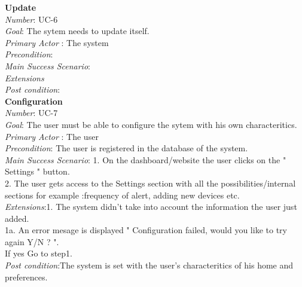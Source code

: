 \textbf{Update}\\
\textit{Number}: UC-6 \\
\textit{Goal}: The sytem needs to update itself. \\
\textit{Primary Actor} : The system \\
\textit{Precondition}: \\
\textit{Main Success Scenario}: \\
\textit{Extensions} \\
\textit{Post condition}: \\

\textbf{Configuration} \\
\textit{Number}: UC-7\\
\textit{Goal}: The user must be able to configure the sytem with his own characteritics. \\
\textit{Primary Actor} : The user \\
\textit{Precondition}: The user is registered in the database of the system. \\
\textit{Main Success Scenario}: 1. On the dashboard/website the user clicks on the " Settings " button. \\
2. The user gets access to the Settings section with all the possibilities/internal sections for example :frequency of alert, adding new devices etc.\\
\textit{Extensions}:1. The system didn't take into account the information the user just added. \\
1a. An error mesage is displayed " Configuration failed, would you like to try again Y/N ? ". \\
If yes Go to step1. \\
\textit{Post condition}:The system is set with the user's characteritics of his home and preferences. \\